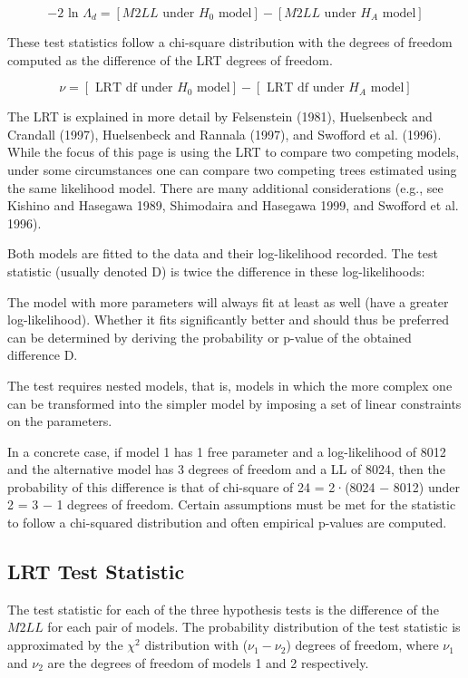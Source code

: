 \documentclass[12pt, a4paper]{article}
\begin{document}
\begin{equation}
-2\mbox{ ln }\Lambda_{d} =  [ M2LL \mbox{ under }H_{0} \mbox{ model}] - [ M2LL \mbox{ under }H_{A} \mbox{ model}]
\end{equation}

These test statistics follow a chi-square distribution with the degrees of freedom computed as the difference of the LRT degrees of freedom.

\begin{equation}
\nu = [\mbox{ LRT df under }H_{0} \mbox{ model}] - [\mbox{ LRT df under }H_{A} \mbox{ model}]
\end{equation}

\bigskip

The LRT is explained in more detail by Felsenstein (1981), Huelsenbeck and Crandall (1997), Huelsenbeck and Rannala (1997), and Swofford et al. (1996). While the focus of this page is using the LRT to compare two competing models, under some circumstances one can compare two competing trees estimated using the same likelihood model. There are many additional considerations (e.g., see Kishino and Hasegawa 1989, Shimodaira and Hasegawa 1999, and Swofford et al. 1996).\\
\bigskip


Both models are fitted to the data and their log-likelihood recorded. The test statistic (usually denoted D) is twice the difference in these log-likelihoods:

The model with more parameters will always fit at least as well (have a greater log-likelihood). Whether it fits significantly better and should thus be preferred can be determined by deriving the probability or p-value of the obtained difference D. 

\bigskip
The test requires nested models, that is, models in which the more complex one can be transformed into the simpler model by imposing a set of linear constraints on the parameters.

In a concrete case, if model 1 has 1 free parameter and a log-likelihood of 8012 and the alternative model has 3 degrees of freedom and a LL of 8024, then the probability of this difference is that of chi-square of 24 = 2·(8024 − 8012) under 2 = 3 − 1 degrees of freedom. Certain assumptions must be met for the statistic to follow a chi-squared distribution and often empirical p-values are computed.


\subsection{LRT Test Statistic}
The test statistic for each of the three hypothesis tests is the difference of the $M2LL$ for each pair of models. 	The probability distribution of the test statistic is approximated by the $\chi^2$ distribution with ($\nu_{1} - \nu_{2}$) degrees of freedom, where $\nu_{1}$ and $\nu_{2}$ are the degrees of freedom of models 1 and 2 respectively. 
\end{document}
